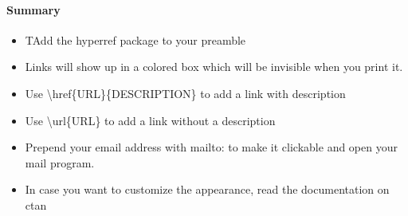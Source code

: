   \paragraph{Summary}
    \begin{itemize} %
      \item TAdd the hyperref package to your preamble
      \item Links will show up in a colored box which will be invisible when you print it.
      \item Use \textbackslash href\{URL\}\{DESCRIPTION\} to add a link with description
      \item Use \textbackslash url\{URL\} to add a link without a description
      \item Prepend your email address with mailto: to make it clickable and open your mail program.
      \item In case you want to customize the appearance, read the documentation on ctan
    \end{itemize} 